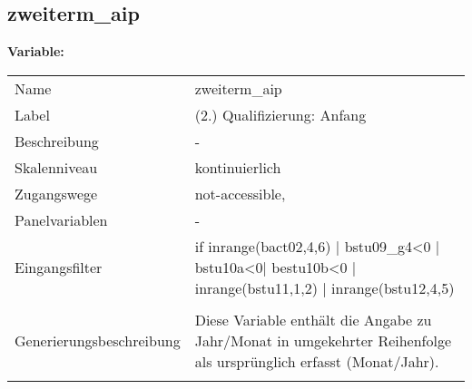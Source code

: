 	
	
	\subsection{zweiterm\_aip}
	\label{subSection:zweiterm_aip}

	\noindent\textbf{Variable:}\\
		\begin{tabular}{lL{11.3cm}}
			\label{tableVariable:zweiterm_aip}
			Name & zweiterm\_aip \\
			Label & (2.) Qualifizierung: Anfang \\
			Beschreibung & - \\
			Skalenniveau & kontinuierlich \\
			Zugangswege &
				not-accessible,
 \\
			Panelvariablen & -
			 \\
			Eingangsfilter & if inrange(bact02,4,6) | bstu09\_g4\textless{}0 | bstu10a\textless{}0| bestu10b\textless{}0 | inrange(bstu11,1,2) | inrange(bstu12,4,5) \\
 \\
					Generierungsbeschreibung & Diese Variable enthält die Angabe zu Jahr/Monat in umgekehrter Reihenfolge als ursprünglich erfasst (Monat/Jahr). 
				 \\	
			 \\
		\end{tabular}





